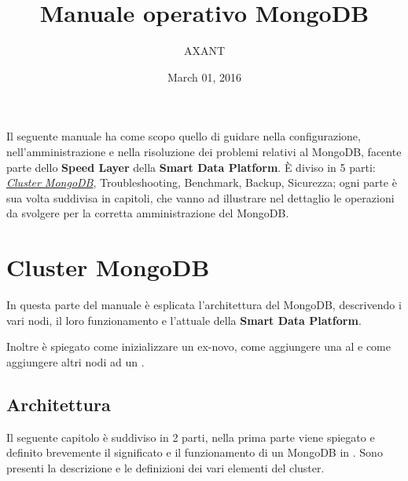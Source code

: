 \documentclass[a4paper,10pt,english]{sphinxmanual}
\title{Manuale operativo MongoDB}
\date{March 01, 2016}
\author{AXANT}
\begin{document}
\maketitle
\tableofcontents
{}\label{index::doc}


Il seguente manuale ha come scopo quello di guidare nella configurazione, nell'amministrazione e
nella risoluzione dei problemi relativi al {\hyperref[cluster_architecture/architecture:cluster]{\emph{}}} MongoDB, facente parte dello
\textbf{Speed Layer} della \textbf{Smart Data Platform}.
È diviso in 5 parti: {\hyperref[cluster_architecture::doc]{\emph{\emph{Cluster MongoDB}}}}, Troubleshooting, Benchmark, Backup, Sicurezza;
ogni parte è sua volta suddivisa in capitoli, che vanno ad illustrare nel dettaglio le operazioni
da svolgere per la corretta amministrazione del {\hyperref[cluster_architecture/architecture:cluster]{\emph{}}} MongoDB.


\part{Cluster MongoDB}
\label{cluster_architecture::doc}\label{cluster_architecture:introduzione}\label{cluster_architecture:cluster-mongodb}
In questa parte del manuale è esplicata l'architettura del {\hyperref[cluster_architecture/architecture:cluster]{\emph{}}} MongoDB, descrivendo i
vari nodi, il loro funzionamento e l'attuale {\hyperref[cluster_architecture/architecture:deploy-architecture]{\emph{}}} della \textbf{Smart Data
Platform}.

Inoltre è spiegato come inizializzare un {\hyperref[cluster_architecture/architecture:cluster]{\emph{}}} ex-novo, come aggiungere una {\hyperref[cluster_architecture/architecture:shard]{\emph{}}}
al {\hyperref[cluster_architecture/architecture:cluster]{\emph{}}} e come aggiungere altri nodi ad un {\hyperref[cluster_architecture/architecture:replica-set]{\emph{}}}.


\chapter{Architettura}
\label{cluster_architecture/architecture:architettura}\label{cluster_architecture/architecture::doc}\label{cluster_architecture/architecture:architecture}
Il seguente capitolo è suddiviso in 2 parti, nella prima parte viene spiegato e definito
brevemente il significato e il funzionamento di un {\hyperref[cluster_architecture/architecture:cluster]{\emph{}}} MongoDB in {\hyperref[cluster_architecture/architecture:sharding]{\emph{}}}.
Sono presenti la descrizione e le definizioni dei vari elementi del cluster.
\end{document}
